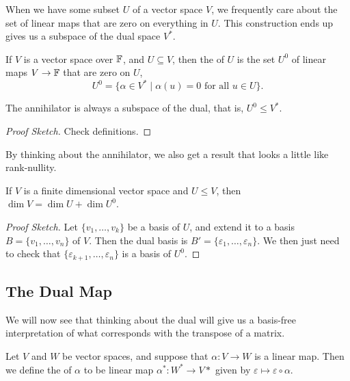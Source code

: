 \documentclass[a4paper]{scrartcl}
\begin{document}
When we have some subset $U$ of a vector space $V$, we frequently care about the set of linear maps that are zero on everything in $U$. This construction ends up gives us a subspace of the dual space $V^*$.


\begin{definition}[Annihilator]
    If $V$ is a vector space over $\mathbb{F}$, and $U \subseteq V$, then the  of $U$ is the set $U^0$ of linear maps $V \rightarrow \mathbb{F}$ that are zero on $U$,
    $$
    U^0 = \{ \alpha \in V^* \mid \alpha(u) = 0 \text{ for all }u \in U\}.
    $$
\end{definition}

\begin{lemma}
    The annihilator is always a subspace of the dual, that is, $U^0 \leq V^*$.
\end{lemma}
\begin{proof}[Proof Sketch]    
    Check definitions.
\end{proof}

By thinking about the annihilator, we also get a result that looks a little like rank-nullity.

\begin{lemma}
    If $V$ is a finite dimensional vector space and $U \leq V$, then $\dim V = \dim U + \dim U^0$.
\end{lemma}
\begin{proof}[Proof Sketch]
    Let $\{v_1, \dots, v_k\}$ be a basis of $U$, and extend it to a basis $B = \{v_1, \dots, v_n\}$ of $V$. Then the dual basis is $B' = \{\varepsilon_1, \dots, \varepsilon_n\}$.
    We then just need to check that $\{\varepsilon_{k + 1}, \dots, \varepsilon_n\}$ is a basis of $U^0$.
\end{proof}

\subsection{The Dual Map}

We will now see that thinking about the dual will give us a basis-free interpretation of what corresponds with the transpose of a matrix.

\begin{definition}
    Let $V$ and $W$ be vector spaces, and suppose that $\alpha: V \rightarrow W$ is a linear map. Then we define the  of $\alpha$ to be linear map $\alpha^*: W^* \rightarrow V*$ given by $\varepsilon \mapsto \varepsilon \circ \alpha$.
\end{definition}
\end{document}
